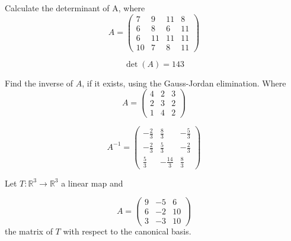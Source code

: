 \begin{questions}

\question Calculate the determinant of A, where
$$
A=\left(\begin{array}{rrrr}
7 & 9 & 11 & 8 \\
6 & 8 & 6 & 11 \\
6 & 11 & 11 & 11 \\
10 & 7 & 8 & 11
\end{array}\right)
$$

\begin{solution}
$$\det(A)=143$$
\end{solution}

\question Find the inverse of $A$, if it exists, using the Gauss-Jordan elimination. Where
$$
A=\left(\begin{array}{rrr}
4 & 2 & 3 \\
2 & 3 & 2 \\
1 & 4 & 2
\end{array}\right)
$$

\begin{solution}
$$A^{-1}=\left(\begin{array}{rrr}
-\frac{2}{3} & \frac{8}{3} & -\frac{5}{3} \\
-\frac{2}{3} & \frac{5}{3} & -\frac{2}{3} \\
\frac{5}{3} & -\frac{14}{3} & \frac{8}{3}
\end{array}\right)$$
\end{solution}

\question Let $T:\mathbb{R}^3\rightarrow\mathbb{R}^3$  a linear map and
 
$$
A=\left(\begin{array}{rrr}
9 & -5 & 6 \\
6 & -2 & 10 \\
3 & -3 & 10
\end{array}\right)
$$
the matrix of $T$ with respect to the canonical basis.
\end{questions}
